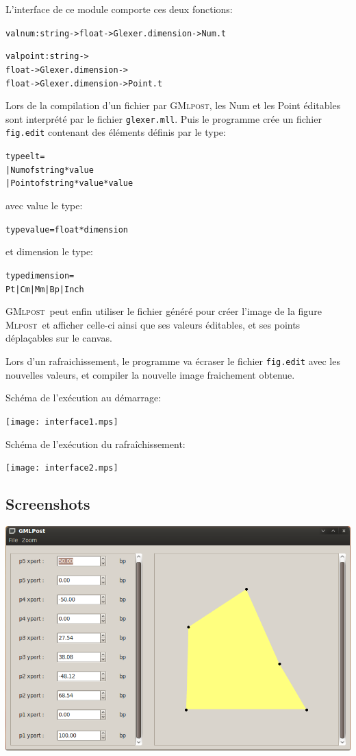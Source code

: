 \documentclass[a4paper,12pt]{article}
\newcommand{\mlpost}{\textsc{Mlpost}}
\newcommand{\gmlpost}{\textsc{GMlpost}}
\begin{document}
L'interface de ce module comporte ces deux fonctions:
\begin{alltt}
  val num: string -> float -> Glexer.dimension -> Num.t

  val point: string -> 
  float -> Glexer.dimension -> 
  float -> Glexer.dimension -> Point.t
\end{alltt}

Lors de la compilation d'un fichier par \gmlpost, les Num et les Point éditables sont interprété par le fichier \texttt{glexer.mll}. Puis le programme crée un fichier \texttt{fig.edit} contenant des éléments définis par le type:
\begin{alltt}
  type elt = 
  | Num of string * value
  | Point of string * value * value
\end{alltt}
avec value le type:
\begin{alltt}
  type value = float * dimension
\end{alltt}
et dimension le type:
\begin{alltt}
  type dimension =
  Pt | Cm | Mm | Bp | Inch
\end{alltt}

\gmlpost\ peut enfin utiliser le fichier généré pour créer l'image de la figure \mlpost\ et afficher celle-ci ainsi que ses valeurs éditables, et ses points déplaçables sur le canvas.

Lors d'un rafraichissement, le programme va écraser le fichier \texttt{fig.edit} avec les nouvelles valeurs, et compiler la nouvelle image fraichement obtenue.

\bigskip

Schéma de l'exécution au démarrage:
\begin{center}
\texttt{[image: interface1.mps]}
\end{center}

\bigskip

Schéma de l'exécution du rafraîchissement:
\begin{center}
\texttt{[image: interface2.mps]}
\end{center}

\newpage
\subsection{Screenshots}
\bigskip

\includegraphics[scale=0.45]{screen1.png}
\end{document}
